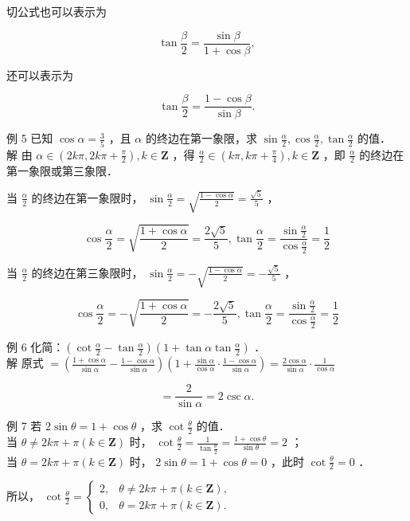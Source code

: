 \documentclass[10pt]{article}
\begin{document}
切公式也可以表示为

\[
\tan \frac{\beta}{2}=\frac{\sin \beta}{1+\cos \beta},
\]

还可以表示为

\[
\tan \frac{\beta}{2}=\frac{1-\cos \beta}{\sin \beta} .
\]

例 5 已知 \(\cos \alpha=\frac{3}{5}\) ，且 \(\alpha\) 的终边在第一象限，求 \(\sin \frac{\alpha}{2}, \cos \frac{\alpha}{2}, \tan \frac{\alpha}{2}\) 的值．\\
解 由 \(\alpha \in\left(2 k \pi, 2 k \pi+\frac{\pi}{2}\right), k \in \mathbf{Z}\) ，得 \(\frac{\alpha}{2} \in\left(k \pi, k \pi+\frac{\pi}{4}\right), k \in \mathbf{Z}\) ，即 \(\frac{\alpha}{2}\) 的终边在第一象限或第三象限．

当 \(\frac{\alpha}{2}\) 的终边在第一象限时， \(\sin \frac{\alpha}{2}=\sqrt{\frac{1-\cos \alpha}{2}}=\frac{\sqrt{5}}{5}\) ，

\[
\cos \frac{\alpha}{2}=\sqrt{\frac{1+\cos \alpha}{2}}=\frac{2 \sqrt{5}}{5}, \tan \frac{\alpha}{2}=\frac{\sin \frac{\alpha}{2}}{\cos \frac{\alpha}{2}}=\frac{1}{2}
\]

当 \(\frac{\alpha}{2}\) 的终边在第三象限时， \(\sin \frac{\alpha}{2}=-\sqrt{\frac{1-\cos \alpha}{2}}=-\frac{\sqrt{5}}{5}\) ，

\[
\cos \frac{\alpha}{2}=-\sqrt{\frac{1+\cos \alpha}{2}}=-\frac{2 \sqrt{5}}{5}, \tan \frac{\alpha}{2}=\frac{\sin \frac{\alpha}{2}}{\cos \frac{\alpha}{2}}=\frac{1}{2}
\]

例 6 化简：\(\left(\cot \frac{\alpha}{2}-\tan \frac{\alpha}{2}\right)\left(1+\tan \alpha \tan \frac{\alpha}{2}\right)\) ．\\
解 原式 \(=\left(\frac{1+\cos \alpha}{\sin \alpha}-\frac{1-\cos \alpha}{\sin \alpha}\right)\left(1+\frac{\sin \alpha}{\cos \alpha} \cdot \frac{1-\cos \alpha}{\sin \alpha}\right)=\frac{2 \cos \alpha}{\sin \alpha} \cdot \frac{1}{\cos \alpha}\)

\[
=\frac{2}{\sin \alpha}=2 \csc \alpha .
\]

例 7 若 \(2 \sin \theta=1+\cos \theta\) ，求 \(\cot \frac{\theta}{2}\) 的值．\\
当 \(\theta \neq 2 k \pi+\pi(k \in \mathbf{Z})\) 时， \(\cot \frac{\theta}{2}=\frac{1}{\tan \frac{\theta}{2}}=\frac{1+\cos \theta}{\sin \theta}=2\) ；\\
当 \(\theta=2 k \pi+\pi(k \in \mathbf{Z})\) 时， \(2 \sin \theta=1+\cos \theta=0\) ，此时 \(\cot \frac{\theta}{2}=0\) ．

所以， \(\cot \frac{\theta}{2}= \begin{cases}2, & \theta \neq 2 k \pi+\pi(k \in \mathbf{Z}), \\ 0, & \theta=2 k \pi+\pi(k \in \mathbf{Z}) .\end{cases}\)
\end{document}
